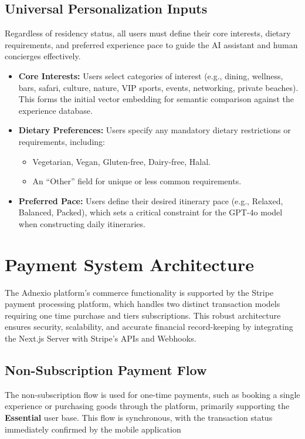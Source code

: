 \subsection{Universal Personalization Inputs}
Regardless of residency status, all users must define their core interests, dietary requirements, and preferred experience pace to guide the AI assistant and human concierges effectively.
\begin{itemize}
    \item \textbf{Core Interests:} Users select categories of interest (e.g., dining, wellness, bars, safari, culture, nature, VIP sports, events, networking, private beaches). This forms the initial vector embedding for semantic comparison against the experience database.
    \item \textbf{Dietary Preferences:} Users specify any mandatory dietary restrictions or requirements, including:
    \begin{itemize}
        \item Vegetarian, Vegan, Gluten-free, Dairy-free, Halal.
        \item An ``Other'' field for unique or less common requirements.
    \end{itemize}
    \item \textbf{Preferred Pace:} Users define their desired itinerary pace (e.g., Relaxed, Balanced, Packed), which sets a critical constraint for the GPT-4o model when constructing daily itineraries.
\end{itemize}
\section{Payment System Architecture}
\label{section:Payment System Architecture}
The Adnexio platform's commerce functionality is supported by the Stripe payment processing platform, which handles two distinct transaction models requiring one time purchase and tiers subscriptions. This robust architecture ensures security, scalability, and accurate financial record-keeping by integrating the Next.js Server with Stripe's APIs and Webhooks.
\subsection{Non-Subscription Payment Flow}
\label{subsection:Non-Subscription Payment Flow}
The non-subscription flow is used for one-time payments, such as booking a single experience or purchasing goods through the platform, primarily supporting the \textbf{Essential} user base. This flow is synchronous, with the transaction status immediately confirmed by the mobile application

